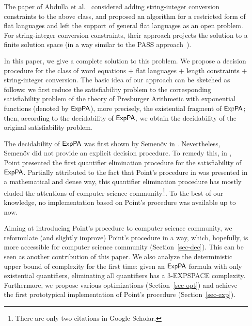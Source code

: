 The paper of Abdulla et al.~\cite{Parosh:20:PLDI} considered adding string-integer conversion constraints to the above class,
and proposed an algorithm for a restricted form of flat languages and left the support of general flat languages as an open problem.
For string-integer conversion constraints, their approach projects the solution to 
a finite solution space (in a way similar to the PASS approach~\cite{goudong2013pass}).

In this paper, we give a complete solution to this problem.
We propose a decision procedure for the class of word equations + flat languages + length constraints + string-integer conversion.
The basic idea of our approach can be sketched as follows: we first reduce the satisfiability problem to the corresponding satisfiability problem of the theory of Presburger Arithmetic with exponential functions (denoted by ${\sf ExpPA}$), more precisely, the existential fragment of ${\sf ExpPA}$; then, according to the decidability of ${\sf ExpPA}$, we obtain the decidability of the original satisfiability problem.  

The decidability of ${\sf ExpPA}$ was first shown by Semen\"{o}v in \cite{Semenov84}. Nevertheless, Semen\"{o}v did not provide an explicit decision procedure. To remedy this, in \cite{Point86}, Point presented the first quantifier elimination procedure for the satisfiability of ${\sf ExpPA}$. Partially attributed to the fact that Point's procedure in \cite{Point86} was presented  in a mathematical and dense way, this quantifier elimination procedure has mostly eluded the attentions of computer science community\footnote{There are only two citations in Google Scholar.}.  To the best of our knowledge, no implementation based on Point's procedure was available up to now. 

Aiming at introducing Point's procedure to computer science community, we reformulate (and slightly improve) Point's procedure in a way, which, hopefully, is more accessible for computer science community (Section~\ref{sec-dec}). This can be seen as another contribution of this paper.
We also analyze the deterministic upper bound of complexity for the first time: given an ${\sf ExpPA}$ formula with only existential quantifiers, eliminating all quantifiers has a 3-EXPSPACE complexity. Furthermore, we propose various optimizations (Section~\ref{sec-opt}) and achieve the first prototypical implementation of Point's procedure (Section~\ref{sec-exp}).

